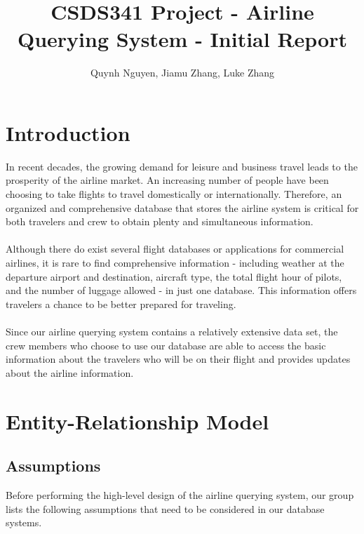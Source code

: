 \documentclass{article}
\title{CSDS341 Project - Airline Querying System - Initial Report}
\author{Quynh Nguyen, Jiamu Zhang, Luke Zhang}
\begin{document}
	
	
	\maketitle
	
	\section{Introduction}
	
	In recent decades, the growing demand for leisure and business travel leads to the prosperity of the airline market. An increasing number of people have been choosing to take flights to travel domestically or internationally. Therefore, an organized and comprehensive database that stores the airline system is critical for both travelers and crew to obtain plenty and simultaneous information.
	\\
	\\
	Although there do exist several flight databases or applications for commercial airlines, it is rare to find comprehensive information - including weather at the departure airport and destination, aircraft type, the total flight hour of pilots, and the number of luggage allowed - in just one database. This information offers travelers a chance to be better prepared for traveling.
	\\
	\\
	Since our airline querying system contains a relatively extensive data set, the crew members who choose to use our database are able to access the basic information about the travelers who will be on their flight and provides updates about the airline information. 
	
	\section{Entity-Relationship Model}
	
	\subsection{Assumptions}
	{Before performing the high-level design of the airline querying system, our group lists the following assumptions that need to be considered in our database systems.}
	
\end{document}
